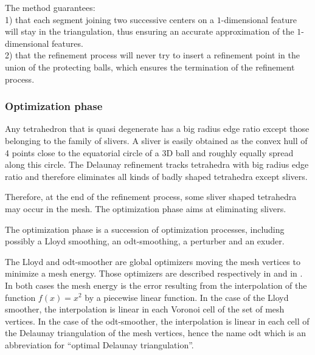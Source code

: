 The method guarantees:\\
1) that each segment joining
two successive centers on a $1$-dimensional feature will stay in the triangulation,
thus ensuring an accurate approximation of  the $1$-dimensional features. \\
2) that the refinement process will never try to insert a refinement point in the union of the
protecting balls, which ensures the termination of the refinement process.



\subsubsection{Optimization phase}

Any tetrahedron that is quasi degenerate has a big radius edge ratio except
those belonging to the family of slivers.  A sliver is easily obtained 
as the convex hull of 4 points close to the equatorial circle of a 3D
ball and roughly equally spread along this circle.
The Delaunay refinement tracks tetrahedra with big radius edge ratio 
and therefore eliminates all kinds of 
 badly shaped tetrahedra except slivers.

Therefore, at the end of the refinement process,
some sliver shaped tetrahedra may occur in the mesh.
The optimization phase aims at eliminating slivers.

The optimization phase is a succession of optimization processes,
including possibly a Lloyd smoothing, an odt-smoothing,
a perturber and an exuder.

The  Lloyd and odt-smoother are global optimizers
 moving the  mesh vertices to  minimize  
a   mesh energy.   Those optimizers are described respectively in 
\cite{cgal:dfg-cvtaa-99t, cgal:dw-tmgob-02} and  in \cite{cgal::c-mssbo-04,cgal:acyd-vtm-05}.
In both cases the mesh energy
is  the   error  resulting from the interpolation 
of the function $f(x) =x^2$ by a  piecewise linear function.
In the case of the Lloyd smoother,
the interpolation  is  linear in each Voronoi cell of the set of  mesh vertices.
In the case of the odt-smoother,  the interpolation is linear in each cell 
of the Delaunay triangulation of the  mesh vertices,
hence the name odt which is an  abbreviation for ``optimal Delaunay triangulation''.


